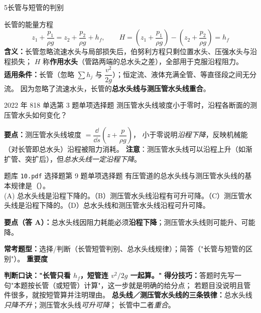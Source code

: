 \begin{kaodian}{5}{长管与短管的判别}
\begin{gongshi}{长管的能量方程}
\[ z_1+\frac{p_1}{\rho g}=z_2+\frac{p_2}{\rho g}+h_f,\qquad
   H=\left(z_1+\frac{p_1}{\rho g}\right)-\left(z_2+\frac{p_2}{\rho g}\right)=h_f \]
\textbf{含义：}长管忽略流速水头与局部损失后，伯努利方程只剩位置水头、压强水头与沿程损失；
$H$ 称\textbf{作用水头}（管路两端的总水头之差），全部用于克服沿程阻力。\\
\textbf{适用条件：}长管（忽略 $\sum h_j$ 与 $\dfrac{v^2}{2g}$）；恒定流、液体充满全管、等直径段之间无分流。
因为忽略了流速水头，长管的\textbf{总水头线与测压管水头线重合}。
\end{gongshi}

\begin{zhenti}{2022 年 818 单选第 3 题}{单项选择题}
测压管水头线坡度小于零时，沿程各断面的测压管水头如何变化？
\end{zhenti}
\noindent\textbf{要点：}测压管水头线坡度 $=\dfrac{\dd}{\dd s}\left(z+\dfrac{p}{\rho g}\right)$，
小于零说明\emph{沿程下降}，反映机械能（对长管即总水头）沿程被阻力消耗。
\textbf{注意}：测压管水头线可以沿程上升（如渐扩管、突扩后），但\emph{总水头线一定沿程下降}。

\begin{zhenti}{题库 \texttt{10.pdf} 选择题第 9 题}{单项选择题}
有压管道的总水头线与测压管水头线的基本规律是（\quad）。\\
(A) 总水头线是沿程下降的。（B）测压管水头线沿程有可升可降。（C）测压管水头线是沿程下降的。（D）总水头线和测压管水头线沿程可升可降。
\end{zhenti}
\noindent\textbf{要点（答 A）：}总水头线因阻力耗能必须\textbf{沿程下降}；测压管水头线则可能升、可能降。

\textbf{常考题型：}选择/判断（长管短管判别、总水头线规律）；简答（"长管与短管的区别"）。
\textbf{重要度 }\quad{}\quad{}

\begin{banfa}
\textbf{判断口诀："长管只看 $h_f$，短管连 $v^2/2g$ 一起算。"}
\textbf{得分技巧：}答题时先写一句"本题按长管（或短管）计算"，这一步就是明确的给分点；
若题目没说明且管件很多，就按短管算并注明理由。
\textbf{总头线／测压管水头线的三条铁律：}总水头线\emph{只降不升}；测压管水头线\emph{可升可降}；
长管中二者\emph{重合}。
\end{banfa}
\end{kaodian}


